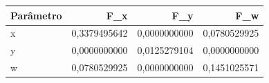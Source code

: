 \begin{tabular}{lrrr}
\toprule
Parâmetro & F\_x & F\_y & F\_w \\
\midrule
x & 0,3379495642 & 0,0000000000 & 0,0780529925 \\
y & 0,0000000000 & 0,0125279104 & 0,0000000000 \\
w & 0,0780529925 & 0,0000000000 & 0,1451025571 \\
\bottomrule
\end{tabular}
